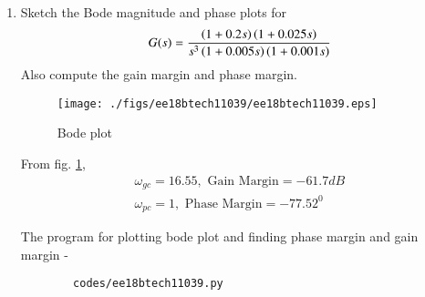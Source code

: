 \begin{enumerate}[label=\thesubsection.\arabic*.,ref=\thesubsection.\theenumi]
    
    \item Sketch the Bode magnitude and phase plots for 
    \begin{align}
        G(s) = \frac{\left(1+0.2s\right)\left(1+0.025s\right)}{s^3\left(1+0.005s\right)\left(1+0.001s\right)}
    \end{align}
    Also compute the gain margin and phase margin.\\
    \solution
    
    \begin{figure}[!h]
    \centering
      \texttt{[image: ./figs/ee18btech11039/ee18btech11039.eps]}
      \caption{Bode plot}
      \label{fig:ee18btech11039}
    \end{figure}
    
    From fig. \ref{fig:ee18btech11039},
    \begin{align}
        \omega_{gc} = 16.55, \text{ Gain Margin} = -61.7 dB \\
        \omega_{pc} = 1, \text{ Phase Margin} = -77.52^0
    \end{align}
    
    The program for plotting bode plot and finding phase margin and gain margin -
    \begin{lstlisting}
        codes/ee18btech11039.py
    \end{lstlisting}
    
    \end{enumerate}
    
    
